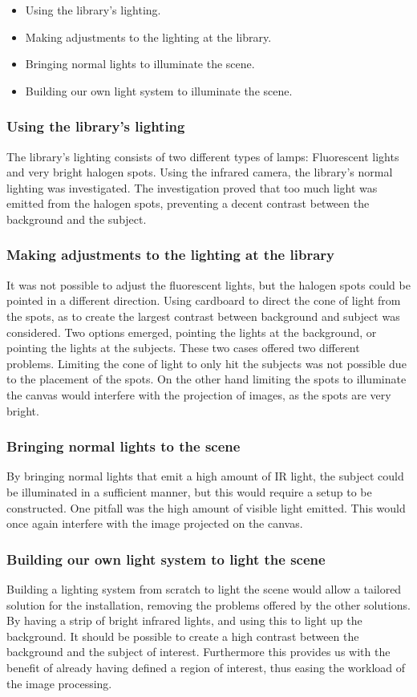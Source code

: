 \begin{itemize}
\item Using the library's lighting.
\item Making adjustments to the lighting at the library.
\item Bringing normal lights to illuminate the scene.
\item Building our own light system to illuminate the scene.
\end{itemize}

\subsubsection{Using the library's lighting}
The library's lighting consists of two different types of lamps: Fluorescent lights and very bright halogen spots. Using the infrared camera, the library's normal lighting was investigated. The investigation proved that too much light was emitted from the halogen spots, preventing a decent contrast between the background and the subject.

\subsubsection{Making adjustments to the lighting at the library}
It was not possible to adjust the fluorescent lights, but the halogen spots could be pointed in a different direction. Using cardboard to direct the cone of light from the spots, as to create the largest contrast between background and subject was considered. Two options emerged, pointing the lights at the background, or pointing the lights at the subjects. These two cases offered two different problems. Limiting the cone of light to only hit the subjects was not possible due to the placement of the spots. On the other hand limiting the spots to illuminate the canvas would interfere with the projection of images, as the spots are very bright.

\subsubsection{Bringing normal lights to the scene} 
By bringing normal lights that emit a high amount of IR light, the subject could be illuminated in a sufficient manner, but this would require a setup to be constructed. One pitfall was the high amount of visible light emitted. This would once again interfere with the image projected on the canvas.

\subsubsection{Building our own light system to light the scene}\label{sec:led_roi}
Building a lighting system from scratch to light the scene would allow a tailored solution for the installation, removing the problems offered by the other solutions. By having a strip of bright infrared lights, and using this to light up the background. It should be possible to create a high contrast between the background and the subject of interest. Furthermore this provides us with the benefit of already having defined a region of interest, thus easing the workload of the image processing.

